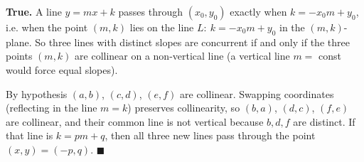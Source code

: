\textbf{True.} A line $y=mx+k$ passes through $(x_0,y_0)$ exactly when $k=-x_0m+y_0$, i.e. when the point $(m,k)$ lies on the line $L:\ k=-x_0m+y_0$ in the $(m,k)$-plane. So three lines with distinct slopes are concurrent if and only if the three points $(m,k)$ are collinear on a non-vertical line (a vertical line $m=$ const would force equal slopes).

By hypothesis $(a,b)$, $(c,d)$, $(e,f)$ are collinear. Swapping coordinates (reflecting in the line $m=k$) preserves collinearity, so $(b,a)$, $(d,c)$, $(f,e)$ are collinear, and their common line is not vertical because $b,d,f$ are distinct. If that line is $k=pm+q$, then all three new lines pass through the point $(x,y)=(-p,q)$. $\blacksquare$
